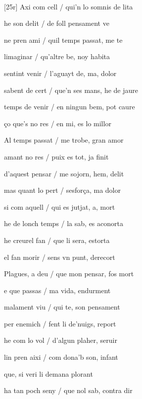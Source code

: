 \documentclass[12pt]{article}
\renewcommand{\espaiAbansEtiquetaPoema}{\vspace{0ex}}
\begin{document}
\begin{estrofa}

\espaiAbansEtiquetaPoema

\\

\end{estrofa}


\begin{estrofa}

 [25r] Axi com cell / qui'n lo somnis de lita

 he son delit / de foll pensament ve

 ne pren ami / quil temps passat, me te

 limaginar / qu'altre be, noy habita

 sentint venir / l'aguayt de, ma, dolor

 sabent de cert / que'n ses mans, he de jaure

 temps de venir / en ningun bem, pot caure

 \c{c}o que's no res / en mi, es lo millor

\end{estrofa}



\begin{estrofa}

 Al temps passat / me trobe, gran amor

 amant no res / puix es tot, ja finit

 d'aquest pensar / me sojorn, hem, delit

 mas quant lo pert / sesfor\c{c}a, ma dolor

 si com aquell / qui es jutjat, a, mort

 he de lonch temps / la sab, es aconorta

 he creurel fan / que li sera, estorta

 el fan morir / sens vn punt, derecort

\end{estrofa}



\begin{estrofa}

 Plagues, a deu / que mon pensar, fos mort

 e que passas / ma vida, endurment

 malament viu / qui te, son pensament

 per enemich / fent li de'nuigs, report

 he com lo vol / d'algun plaher, seruir

 lin pren aixi / com dona'b son, infant

 que, si veri li demana plorant

 ha tan poch seny / que nol sab, contra dir

\end{estrofa}
\end{document}
